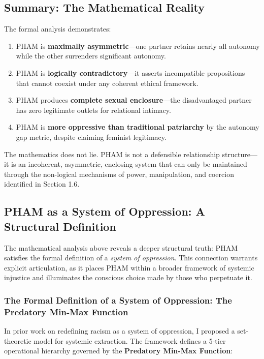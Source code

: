 \documentclass[12pt, letterpaper]{article}
\begin{document}
\subsection{Summary: The Mathematical Reality}

The formal analysis demonstrates:

\begin{enumerate}
    \item PHAM is \textbf{maximally asymmetric}---one partner retains nearly all autonomy while the other surrenders significant autonomy.
    
    \item PHAM is \textbf{logically contradictory}---it asserts incompatible propositions that cannot coexist under any coherent ethical framework.
    
    \item PHAM produces \textbf{complete sexual enclosure}---the disadvantaged partner has zero legitimate outlets for relational intimacy.
    
    \item PHAM is \textbf{more oppressive than traditional patriarchy} by the autonomy gap metric, despite claiming feminist legitimacy.
\end{enumerate}

The mathematics does not lie. PHAM is not a defensible relationship structure---it is an incoherent, asymmetric, enclosing system that can only be maintained through the non-logical mechanisms of power, manipulation, and coercion identified in Section 1.6.

\subsection{PHAM as a System of Oppression: A Structural Definition}

The mathematical analysis above reveals a deeper structural truth: PHAM satisfies the formal definition of a \textit{system of oppression}. This connection warrants explicit articulation, as it places PHAM within a broader framework of systemic injustice and illuminates the conscious choice made by those who perpetuate it.

\subsubsection{The Formal Definition of a System of Oppression: The Predatory Min-Max Function}

In prior work on redefining racism as a system of oppression, I proposed a set-theoretic model for systemic extraction. The framework defines a 5-tier operational hierarchy governed by the \textbf{Predatory Min-Max Function}:
\end{document}
